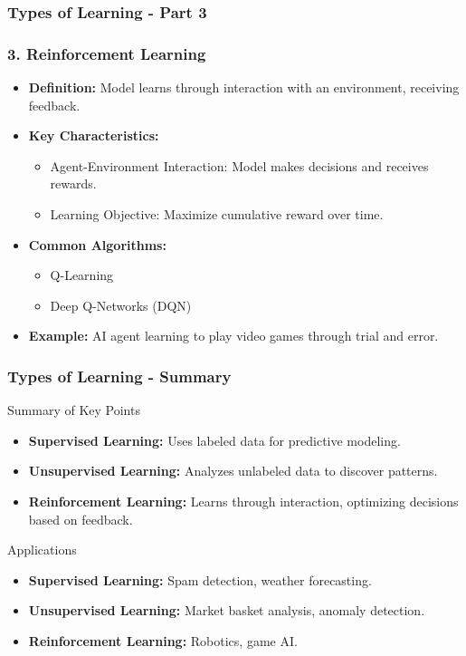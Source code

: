 \documentclass[aspectratio=169]{beamer}
\begin{document}
\begin{frame}[fragile]
    \frametitle{Types of Learning - Part 3}
    \frametitle{3. Reinforcement Learning}

    \begin{itemize}
        \item \textbf{Definition:} Model learns through interaction with an environment, receiving feedback.
        \item \textbf{Key Characteristics:}
            \begin{itemize}
                \item Agent-Environment Interaction: Model makes decisions and receives rewards.
                \item Learning Objective: Maximize cumulative reward over time.
            \end{itemize}
        \item \textbf{Common Algorithms:}
            \begin{itemize}
                \item Q-Learning
                \item Deep Q-Networks (DQN)
            \end{itemize}
        \item \textbf{Example:} AI agent learning to play video games through trial and error.
    \end{itemize}
\end{frame}

\begin{frame}[fragile]
    \frametitle{Types of Learning - Summary}
    \begin{block}{Summary of Key Points}
        \begin{itemize}
            \item \textbf{Supervised Learning:} Uses labeled data for predictive modeling.
            \item \textbf{Unsupervised Learning:} Analyzes unlabeled data to discover patterns.
            \item \textbf{Reinforcement Learning:} Learns through interaction, optimizing decisions based on feedback.
        \end{itemize}
    \end{block}
    
    \begin{block}{Applications}
        \begin{itemize}
            \item \textbf{Supervised Learning:} Spam detection, weather forecasting.
            \item \textbf{Unsupervised Learning:} Market basket analysis, anomaly detection.
            \item \textbf{Reinforcement Learning:} Robotics, game AI.
        \end{itemize}
    \end{block}
\end{frame}
\end{document}

